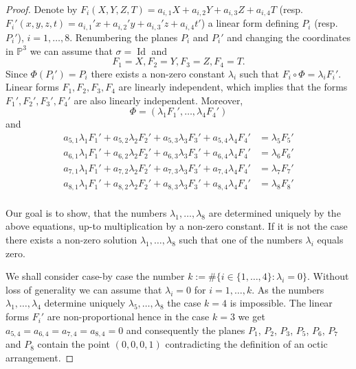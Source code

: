 \documentclass[12pt]{amsart}
\theoremstyle{plain}
\theoremstyle{remark}
\theoremstyle{definition}
\newcommand{\PP}{\mathbb P}
\numberwithin{table}{section}
\begin{document}
\begin{proof}
Denote by $F_i(X,Y,Z,T)=a_{i,1}X+a_{i,2}Y+a_{i,3}Z+a_{i,4}T$ (resp. $F_i'(x,y,z,t)=a_{i,1}'x+a_{i,2}'y+a_{i,3}'z+a_{i,4}t'$) a linear form defining $P_i$ (resp. $P_i'$), $ i=1,\dots,8 $.
Renumbering the planes $ P_i $ and $ P_i' $ and changing the coordinates in $\PP^3$ we can assume that $\sigma=\operatorname{Id}$ and
\[ F_1=X, F_2=Y, F_3=Z, F_4=T. \]
Since $ \Phi(P_{i}')=P_{i} $ there exists a non-zero constant $\lambda_{i}$ such that $F_{i}\circ \Phi=\lambda_{i}F_{i}'$. Linear forms $F_{1},F_{2},F_{3},F_{4}$ are linearly independent, which implies that the forms $F_{1}',F_{2}',F_{3}',F_{4}'$ are also linearly independent.
Moreover,
\[ \Phi=(\lambda_{1}F_{1}',\dots,\lambda_{4}F_{4}') \]
and
\begin{equation}
\begin{aligned}\label{leq}
a_{5,1}\lambda_{1}F_{1}'+ a_{5,2}\lambda_{2}F_{2}'+ a_{5,3}\lambda_{3}F_{3}'+ a_{5,4}\lambda_{4}F_{4}' &= \lambda_{5}F_{5}'\\
a_{6,1}\lambda_{1}F_{1}'+ a_{6,2}\lambda_{2}F_{2}'+ a_{6,3}\lambda_{3}F_{3}'+ a_{6,4}\lambda_{4}F_{4}' &= \lambda_{6}F_{6}'\\
a_{7,1}\lambda_{1}F_{1}'+ a_{7,2}\lambda_{2}F_{2}'+ a_{7,3}\lambda_{3}F_{3}'+ a_{7,4}\lambda_{4}F_{4}' &= \lambda_{7}F_{7}'\\
a_{8,1}\lambda_{1}F_{1}'+ a_{8,2}\lambda_{2}F_{2}'+ a_{8,3}\lambda_{3}F_{3}'+ a_{8,4}\lambda_{4}F_{4}' &= \lambda_{8}F_{8}'\\\end{aligned}
\end{equation}


Our goal is to show, that the numbers $\lambda_{1},\dots,\lambda_{8}$ are determined uniquely by the above equations, up-to multiplication by a non-zero constant. If it is not the case there exists a non-zero solution $\lambda_{1},\dots,\lambda_{8}$ such that one of the numbers $\lambda_{i}$ equals zero.

  We shall consider case-by case the number $k:=\#\{i\in\{1,\dots,4\}: \lambda_{i}=0\}$. Without loss of generality we can assume that $\lambda_{i}=0$ for $i=1,\dots,k$.
  As the numbers $\lambda_{1},\dots,\lambda_{4}$ determine uniquely $\lambda_{5},\dots,\lambda_{8}$ the case $k=4$ is impossible.
  The linear forms $F_{i}'$ are non-proportional hence in the case $k=3$ we get $a_{5,4}=a_{6,4}=a_{7,4}=a_{8,4}=0$ and consequently the planes $P_{1}$, $P_{2}$, $P_{3}$, $P_{5}$, $P_{6}$, $P_{7}$ and $P_{8}$ contain the point $(0,0,0,1)$ contradicting the definition of an octic arrangement.


\end{proof}
\end{document}
